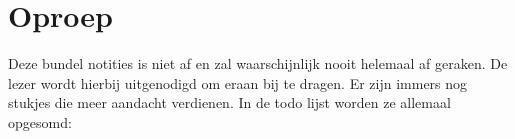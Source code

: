 \documentclass[main.tex]{subfiles}
\begin{document}
\appendix
\chapter{Oproep}
\label{sec:oproep}

Deze bundel notities is niet af en zal waarschijnlijk nooit helemaal af geraken.
De lezer wordt hierbij uitgenodigd om eraan bij te dragen.
Er zijn immers nog  stukjes die meer aandacht verdienen.
In de todo lijst worden ze allemaal opgesomd:

\listoftodos
\end{document}
